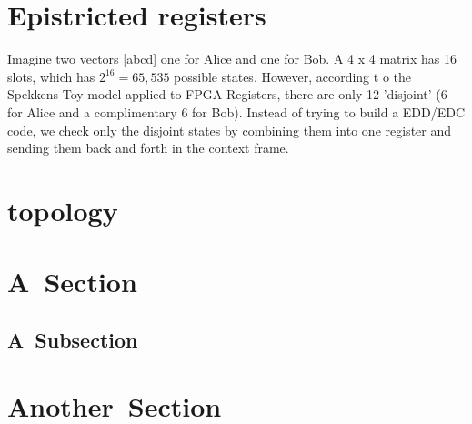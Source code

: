 \section{Epistricted registers}

Imagine two vectors [abcd] one for Alice and one for Bob. A 4 x 4 matrix has 16 slots, which has $2^{16} = 65,535$ possible states. However, according t o the Spekkens Toy model applied to FPGA Registers, there are only 12 'disjoint' (6 for Alice and a complimentary 6 for Bob). Instead of trying to build a EDD/EDC code, we check only the disjoint states by combining them into one register and sending them back and forth in the context frame.

\section{topology}
%



 
\section{A Section}
\subsection{A Subsection}
\section{Another Section}



